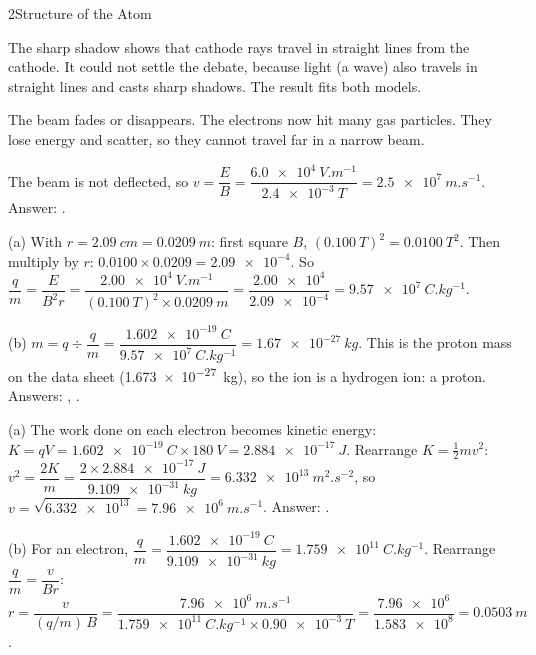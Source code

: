 \begin{chapteranswers}{2}{Structure of the Atom}
  \item The sharp shadow shows that cathode rays travel in straight lines from
        the cathode. It could not settle the debate, because light (a wave) also
        travels in straight lines and casts sharp shadows. The result fits both
        models.
  \item The beam fades or disappears. The electrons now hit many gas particles.
        They lose energy and scatter, so they cannot travel far in a narrow beam.
  \item The beam is not deflected, so
        $v = \dfrac{E}{B} = \dfrac{\qty{6.0e4}{V.m^{-1}}}{\qty{2.4e-3}{T}}
        = \qty{2.5e7}{m.s^{-1}}$.
        Answer: .
  \item (a) With $r = \qty{2.09}{cm} = \qty{0.0209}{m}$: first square $B$,
        $(\qty{0.100}{T})^2 = \qty{0.0100}{T^2}$. Then multiply by $r$:
        $\num{0.0100}\times\num{0.0209} = \num{2.09e-4}$. So
        $\dfrac{q}{m} = \dfrac{E}{B^2 r}
        = \dfrac{\qty{2.00e4}{V.m^{-1}}}{(\qty{0.100}{T})^2\times\qty{0.0209}{m}}
        = \dfrac{\num{2.00e4}}{\num{2.09e-4}} = \qty{9.57e7}{C.kg^{-1}}$.\par
        (b) $m = q \div \dfrac{q}{m} = \dfrac{\qty{1.602e-19}{C}}{\qty{9.57e7}{C.kg^{-1}}}
        = \qty{1.67e-27}{kg}$. This is the proton mass on the data sheet
        (\qty{1.673e-27}{kg}), so the ion is a hydrogen ion: a proton.
        Answers: , .
  \item (a) The work done on each electron becomes kinetic energy:
        $K = qV = \qty{1.602e-19}{C}\times\qty{180}{V} = \qty{2.884e-17}{J}$.
        Rearrange $K = \tfrac12 mv^2$:
        $v^2 = \dfrac{2K}{m} = \dfrac{2\times\qty{2.884e-17}{J}}{\qty{9.109e-31}{kg}}
        = \qty{6.332e13}{m^2.s^{-2}}$, so $v = \sqrt{\num{6.332e13}} = \qty{7.96e6}{m.s^{-1}}$.
        Answer: .\par
        (b) For an electron, $\dfrac{q}{m} = \dfrac{\qty{1.602e-19}{C}}{\qty{9.109e-31}{kg}}
        = \qty{1.759e11}{C.kg^{-1}}$. Rearrange $\dfrac{q}{m} = \dfrac{v}{Br}$:
        $r = \dfrac{v}{(q/m)\,B}
        = \dfrac{\qty{7.96e6}{m.s^{-1}}}{\qty{1.759e11}{C.kg^{-1}}\times\qty{0.90e-3}{T}}
        = \dfrac{\num{7.96e6}}{\num{1.583e8}} = \qty{0.0503}{m}$.

\end{chapteranswers}
